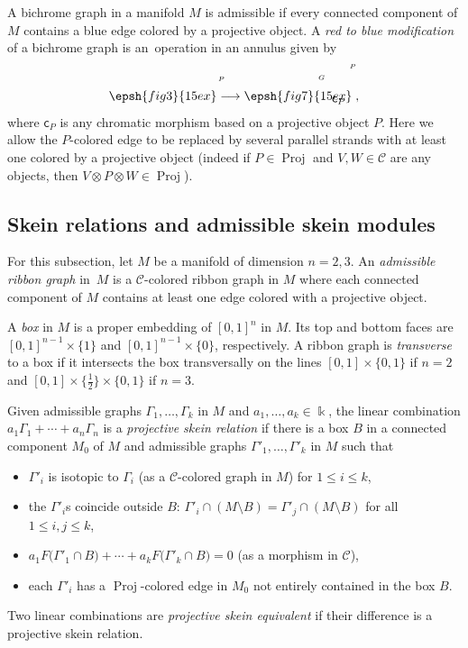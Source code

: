 \documentclass[pdftex]{sigma}
\numberwithin{equation}{section}
\newcommand{\Proj}{\operatorname{Proj}}
\newcommand{\chr}{{\mathsf{c}}}
\numberwithin{theorem}{section}
\numberwithin{proposition}{section}
\numberwithin{definition}{section}
\numberwithin{lemma}{section}
\numberwithin{corollary}{section}
\numberwithin{remark}{section}
\numberwithin{example}{section}
\newcommand{\cat}{\mathcal{C}}
\newcommand{\FK}{{\Bbbk}}
\newcommand{\ms}[1]{\mbox{\tiny\ensuremath{#1}}}
\begin{document}
A bichrome graph in a manifold
$M$ is admissible if
every connected component of $M$ contains a blue edge colored by
a projective object. A \emph{red to blue modification} of a bichrome graph
is an~operation in an annulus given by
\begin{equation}
 \label{eq:redtoblue}
 \epsh{fig3}{15ex}\put(1,15){\ms{P}}\longrightarrow
 \epsh{fig7}{15ex}\put(-16,-2){{${{\chr}}_P$}}
 \put(-27,16){\ms G} \put(-2,25){\ms P} \;,
\end{equation}
where $\chr_P$ is any chromatic morphism based on a projective object $P$.
Here we allow the $P$-colored edge to be replaced by several parallel
strands with at least one colored by a projective object (indeed if $P\in \Proj$ and $V,W\in \cat$ are any objects, then $V\otimes P\otimes W\in \Proj$).


\subsection{Skein relations and admissible skein modules}%
For this subsection, let $M$ be a manifold of dimension $n=2,3$.
An \emph{admissible ribbon graph} in~$M$ is a
$\cat$-colored ribbon graph in $M$ where each connected component of
$M$ contains at least one edge colored with a projective object.

A \emph{box} in $M$ is a proper embedding of $[0,1]^{ n} $ in $M$.
Its top and bottom faces are $[0,1]^{n-1}\times \{1\}$ and
$[0,1]^{n-1}\times \{0\}$, respectively. A ribbon graph is
\emph{transverse} to a box if it intersects the box transversally on
the lines $[0,1] \times \{0,1\}$ if $n=2$ and
$[0,1] \times \bigl\{\frac12\bigr\} \times \{0,1\}$ if $n=3$.

Given admissible graphs $\Gamma_1, \dots,\Gamma_k$ in $M$ and $a_1, \dots,a_k\in \FK$, the linear combination $a_1\Gamma_1 + \cdots + a_n\Gamma_n$ is a \emph{projective skein relation} if there is a box $B$ in a
connected component $M_0$ of $M$ and admissible graphs $\Gamma'_1, \dots,\Gamma'_k$ in $M$ such that
\begin{itemize}\itemsep=0pt
\item $\Gamma'_i$ is isotopic to $\Gamma_i$ (as a $\cat$-colored graph in $M$) for $1 \leq i \leq k$,
\item the $\Gamma'_i$s coincide outside $B$: $\Gamma'_i\cap (M \setminus B)=\Gamma'_j\cap (M \setminus B)$ for all $1 \leq i,j \leq k$,
\item $a_1 F\bigl(\Gamma'_1 \cap B\bigr) + \cdots + a_k F\bigl(\Gamma'_k \cap B\bigr)=0$ (as a morphism in $\cat$),
\item each $\Gamma'_i$
has a
$\Proj$-colored edge in $M_0$ not entirely contained in the box $B$.
\end{itemize}
Two linear combinations are \emph{projective skein
 equivalent} if their difference is a projective skein relation.
\end{document}
